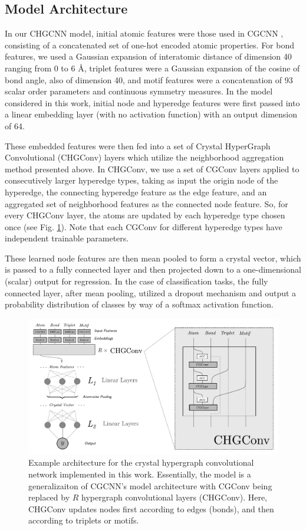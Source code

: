 \documentclass[twoside,twocolumn,9pt]{article}
\begin{document}
\subsection{Model Architecture}
In our CHGCNN model, initial atomic features were those used in CGCNN \cite{cgcnn}, consisting of a concatenated set of one-hot encoded atomic properties. For bond features, we used a Gaussian expansion of interatomic distance of dimension 40 ranging from 0 to 6 \AA, triplet features were a Gaussian expansion of the cosine of bond angle, also of dimension 40, and motif features were a concatenation of 93 scalar order parameters and continuous symmetry measures. In the model considered in this work, initial node and hyperedge features were first passed into a linear embedding layer (with no activation function) with an output dimension of 64. 

These embedded features were then fed into a set of Crystal HyperGraph Convolutional (CHGConv) layers which utilize the neighborhood aggregation method presented above. In CHGConv, we use a set of CGConv \cite{cgcnn} layers applied to consecutively larger hyperedge types, taking as input the origin node of the hyperedge, the connecting hyperedge feature as the edge feature, and an aggregated set of neighborhood features as the connected node feature. So, for every CHGConv layer, the atoms are updated by each hyperedge type chosen once (see Fig. \ref{fig:architecture}). Note that each CGConv for different hyperedge types have independent trainable parameters. 

These learned node features are then mean pooled to form a crystal vector, which is passed to a fully connected layer and then projected down to a one-dimensional (scalar) output for regression. In the case of classification tasks, the fully connected layer, after mean pooling, utilized a dropout mechanism and output a probability distribution of classes by way of a softmax activation function.

\begin{figure}
	\centering
	\includegraphics[scale=.75]{arch_horiz.pdf}
	\caption{Example architecture for the crystal hypergraph convolutional network implemented in this work. Essentially, the model is a generalizaiton of CGCNN's \cite{cgcnn} model architecture with CGConv being replaced by $R$ hypergraph convolutional layers (CHGConv). Here, CHGConv updates nodes first according to edges (bonds), and then according to triplets or motifs. }
	\label{fig:architecture}
\end{figure}
\end{document}
